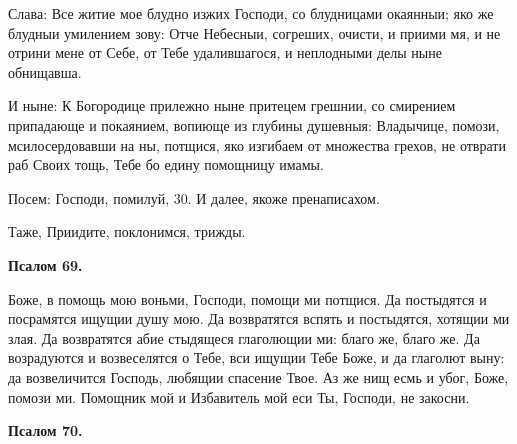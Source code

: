 Слава: Все житие мое блудно изжих Господи, со блудницами окаянныи; яко же блудныи умилением зову: Отче Небесныи, согреших, очисти, и приими мя, и не отрини мене от Себе, от Тебе удалившагося, и неплодными делы ныне обнищавша.

И ныне: К Богородице прилежно ныне притецем грешнии, со смирением припадающе и покаянием, вопиюще из глубины душевныя: Владычице, помози, мсилосердовавши на ны, потщися, яко изгибаем от множества грехов, не отврати раб Своих тощь, Тебе бо едину помощницу имамы.


Посем: Господи, помилуй, 30. И далее, якоже пренаписахом.


Таже, Приидите, поклонимся, трижды.


\medskip


\bfseries Псалом 69.\normalfont{}


Боже, в помощь мою воньми, Господи, помощи ми потщися. Да постыдятся и посрамятся ищущии душу мою. Да возвратятся вспять и постыдятся, хотящии ми злая. Да возвратятся абие стыдящеся глаголющии ми: благо же, благо же. Да возрадуются и возвеселятся о Тебе, вси ищущии Тебе Боже, и да глаголют выну: да возвеличится Господь, любящии спасение Твое. Аз же нищ есмь и убог, Боже, помози ми. Помощник мой и Избавитель мой еси Ты, Господи, не закосни.


\medskip


\bfseries Псалом 70.\normalfont{}


